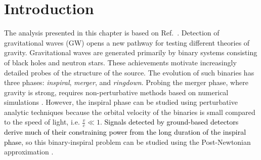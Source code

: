 \section{Introduction} 
The analysis presented in this chapter is based on Ref.~\cite{Bhattacharyya:2023kbh}.
Detection of gravitational waves (GW) \cite{LIGOScientific:2016aoc, LIGOScientific:2016sjg, LIGOScientific:2016vlm, LIGOScientific:2017bnn, Kokeyama:2020dkg, LIGOScientific:2019hgc} opens a new pathway for testing different theories of gravity. Gravitational waves are generated primarily by binary systems consisting of black holes and neutron stars. These achievements motivate increasingly detailed probes of the structure of the source. The evolution of such binaries has three phases: \textit{inspiral}, \textit{merger}, and \textit{ringdown}. Probing the merger phase, where gravity is strong, requires non-perturbative methods based on numerical simulations \cite{Lehner:2014asa, LIGOScientific:2014oec}. However, the inspiral phase can be studied using perturbative analytic techniques because the orbital velocity of the binaries is small compared to the speed of light, i.e. $\frac{v}{c}\ll 1$. \textcolor{black}{Signals detected by ground-based detectors derive much of their constraining power from the long duration of the inspiral phase}, so this binary-inspiral problem can be studied using the Post-Newtonian approximation \cite{Blanchet:2013haa}. %
\par
